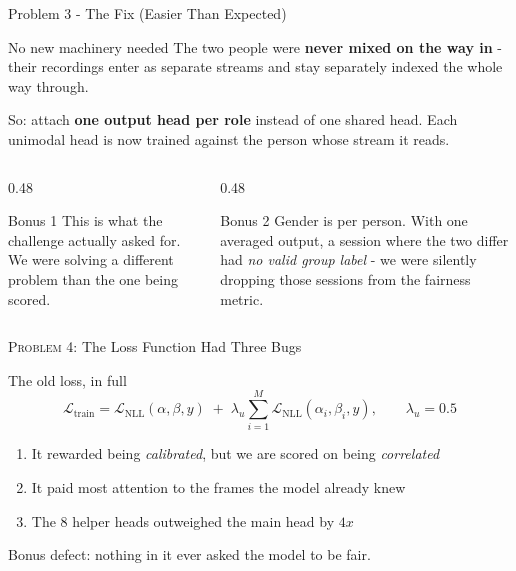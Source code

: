 \documentclass[aspectratio=169]{beamer}
\newcommand{\hl}[1]{\textcolor{coolpurple}{\textbf{#1}}}
\begin{document}
	\begin{frame}{Problem 3 - The Fix (Easier Than Expected)}
		\begin{block}{No new machinery needed}
			\small
			The two people were \textbf{never mixed on the way in} - their recordings enter as
			separate streams and stay separately indexed the whole way through.
			\vspace{0.3em}

			So: attach \hl{one output head per role} instead of one shared head. Each unimodal
			head is now trained against the person whose stream it reads.
		\end{block}
		\vspace{0.3em}
		\begin{columns}[onlytextwidth]
			\begin{column}{0.48\textwidth}
				\begin{block}{Bonus 1}
					\small
					This is what the challenge actually asked for. We were solving a different
					problem than the one being scored.
				\end{block}
			\end{column}
			\begin{column}{0.48\textwidth}
				\begin{block}{Bonus 2}
					\small
					Gender is per person. With one averaged output, a session where the two
					differ had \emph{no valid group label} - we were silently dropping those
					sessions from the fairness metric.
				\end{block}
			\end{column}
		\end{columns}
	\end{frame}


	\begin{frame}{\textsc{Problem 4:} The Loss Function Had Three Bugs}
		\begin{block}{The old loss, in full}
			$$ \mathcal{L}_{\text{train}} = \mathcal{L}_{\text{NLL}}(\alpha,\beta,y)
			\;+\; \lambda_u \sum_{i=1}^{M} \mathcal{L}_{\text{NLL}}(\alpha_i,\beta_i,y),
			\qquad \lambda_u = 0.5 $$
		\end{block}
		\vspace{0.3em}
		\begin{enumerate}
			\small
			\item It rewarded being \emph{calibrated}, but we are scored on being \emph{correlated}
			\item It paid most attention to the frames the model already knew
			\item The 8 helper heads outweighed the main head by $4x$
		\end{enumerate}
		\vspace{0.4em}
		\centering\small
		Bonus defect: nothing in it ever asked the model to be fair.
	\end{frame}
\end{document}
